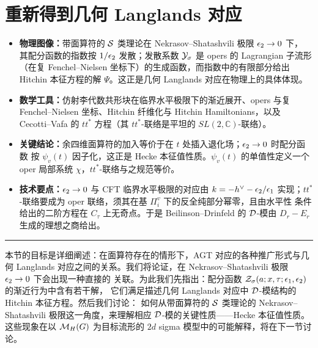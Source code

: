 \section{重新得到几何 Langlands 对应}\label{Hecke1}

\begin{keytakeaways}
\begin{itemize}
  \item \textbf{物理图像：}带面算符的 $\mathcal{S}$ 类理论在 Nekrasov--Shatashvili 极限 $\epsilon_2\to0$ 下，
        其配分函数的指数按 $1/\epsilon_2$ 发散；发散系数 $\mathcal{Y}_\sigma$ 是 opers 的 Lagrangian
        子流形（在复 Fenchel--Nielsen 坐标下）的生成函数，而指数中的有限部分给出 Hitchin
        本征方程的解 $\Psi$。这正是几何 Langlands 对应在物理上的具体体现。
  \item \textbf{数学工具：}仿射李代数共形块在临界水平极限下的渐近展开、opers 与复
        Fenchel--Nielsen 坐标、Hitchin 纤维化与 Hitchin Hamiltonians，以及 Cecotti--Vafa 的
        $tt^*$ 方程（其 $tt^*$-联络是平坦的 $SL(2,\mathbb{C})$-联络）。
  \item \textbf{关键结论：}余四维面算符的加入等价于在 $t$ 处插入退化场；$\epsilon_2\to0$ 时配分函数
        按 $\psi_v(t)$ 因子化，这正是 Hecke 本征值性质。$\psi_v(t)$ 的单值性定义一个 oper
        局部系统 $\chi$，$tt^*$-联络与之规范等价。
  \item \textbf{技术要点：}$\epsilon_2\to0$ 与 CFT 临界水平极限的对应由 $k=-h^{\vee}-\epsilon_2/\epsilon_1$
        实现；$tt^*$-联络要成为 oper 联络，须其在基 $\Pi_i^v$ 下的反全纯部分幂零，且由水平性
        条件给出的二阶方程在 $C_\tau$ 上无奇点。于是 Beilinson--Drinfeld 的 $\mathcal{D}$-模由
        $D_r-E_r$ 生成的理想之商给出。
\end{itemize}
\end{keytakeaways}

\bigskip
\noindent\rule{\textwidth}{0.6pt}
\bigskip

本节的目标是详细阐述：在面算符存在的情形下，AGT 对应的各种推广形式与几何 Langlands
对应之间的关系。我们将论证，在 Nekrasov--Shatashvili 极限 $\epsilon_2\to 0$ 下会出现一种直接的
关联。为此我们先指出：配分函数 $\mathcal{Z}_\sigma(a;x,\tau;\epsilon_1,\epsilon_2)$ 的渐近行为中含有若干解，
它们满足描述几何 Langlands 对应中 $\mathcal{D}$-模结构的 Hitchin 本征方程。然后我们讨论：
如何从带面算符的 $\mathcal{S}$ 类理论的 Nekrasov--Shatashvili 极限这一角度，来理解相应
$\mathcal{D}$-模的关键性质——Hecke 本征值性质。这些现象在以 $\mathcal{M}_H(G)$ 为目标流形的 $2d$ sigma
模型中的可能解释，将在下一节讨论。

